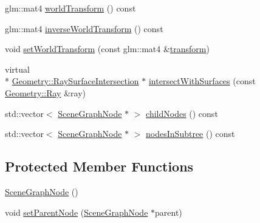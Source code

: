 \begin{DoxyCompactItemize}
glm\-::mat4 \hyperlink{classmotorcar_1_1SceneGraphNode_a3e7fba2add3f63a65f31996f0ce9c9bf}{world\-Transform} () const 
\item 
glm\-::mat4 \hyperlink{classmotorcar_1_1SceneGraphNode_a10e4fd743e891cef676435c5f5d5467d}{inverse\-World\-Transform} () const 
\item 
void \hyperlink{classmotorcar_1_1SceneGraphNode_ac1a30cbe4af18133b19e6f852c33e30a}{set\-World\-Transform} (const glm\-::mat4 \&\hyperlink{classmotorcar_1_1SceneGraphNode_ad96e79fdd739ac8223a3128003be391a}{transform})
\item 
virtual \\*
\hyperlink{structmotorcar_1_1Geometry_1_1RaySurfaceIntersection}{Geometry\-::\-Ray\-Surface\-Intersection} $\ast$ \hyperlink{classmotorcar_1_1SceneGraphNode_ac268b171317430368fcc7733eab05ae6}{intersect\-With\-Surfaces} (const \hyperlink{structmotorcar_1_1Geometry_1_1Ray}{Geometry\-::\-Ray} \&ray)
\item 
std\-::vector$<$ \hyperlink{classmotorcar_1_1SceneGraphNode}{Scene\-Graph\-Node} $\ast$ $>$ \hyperlink{classmotorcar_1_1SceneGraphNode_a9a0c649390da0918afd58805192ccdca}{child\-Nodes} () const 
\item 
std\-::vector$<$ \hyperlink{classmotorcar_1_1SceneGraphNode}{Scene\-Graph\-Node} $\ast$ $>$ \hyperlink{classmotorcar_1_1SceneGraphNode_aa7ac1c085afbe0fb0b9d5cd578a8c4ef}{nodes\-In\-Subtree} () const 
\end{DoxyCompactItemize}
\subsection*{Protected Member Functions}
\begin{DoxyCompactItemize}
\item 
\hyperlink{classmotorcar_1_1SceneGraphNode_ab9bc5f59ccba332aab918c7b066c309f}{Scene\-Graph\-Node} ()
\item 
void \hyperlink{classmotorcar_1_1SceneGraphNode_a977b156ebcc07018a475b4042de8886a}{set\-Parent\-Node} (\hyperlink{classmotorcar_1_1SceneGraphNode}{Scene\-Graph\-Node} $\ast$parent)
\end{DoxyCompactItemize}


